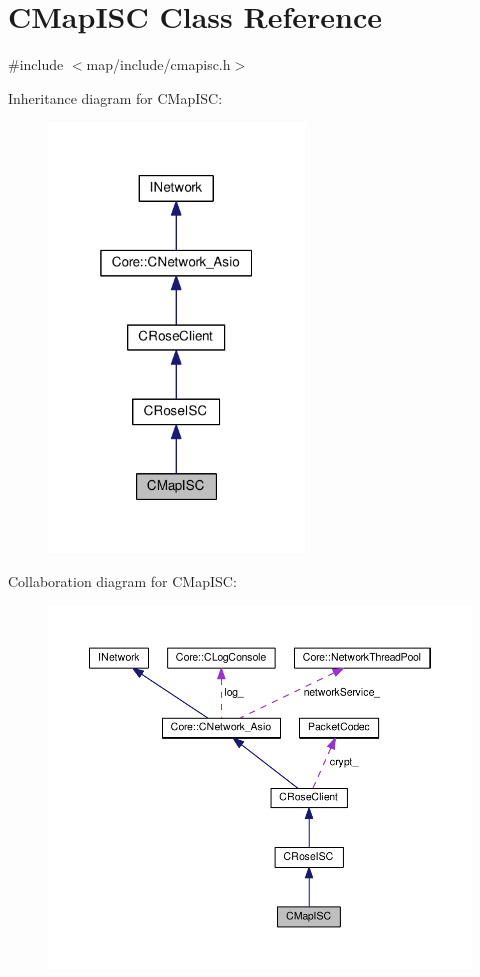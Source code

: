 \hypertarget{classCMapISC}{}\section{C\+Map\+I\+SC Class Reference}
\label{classCMapISC}


{\ttfamily \#include $<$map/include/cmapisc.\+h$>$}



Inheritance diagram for C\+Map\+I\+SC\+:
\nopagebreak
\begin{figure}[H]
\begin{center}
\leavevmode
\includegraphics[width=193pt]{classCMapISC__inherit__graph}
\end{center}
\end{figure}


Collaboration diagram for C\+Map\+I\+SC\+:
\nopagebreak
\begin{figure}[H]
\begin{center}
\leavevmode
\includegraphics[width=350pt]{classCMapISC__coll__graph}
\end{center}
\end{figure}
